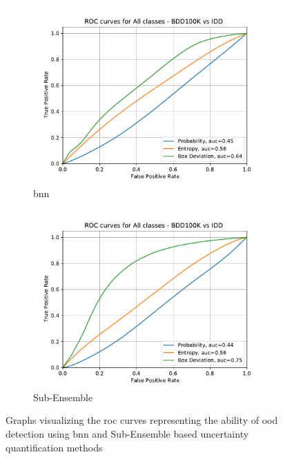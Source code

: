     \begin{figure}[ht]
    	\centering
    	\begin{subfigure}[t]{0.495\textwidth}
    		\centering
    		\includegraphics[width=\textwidth]{images/ROC/all classes_ROC_bdd_vs_idd_Score_using_bnn.pdf}
    		\caption{\acrshort{bnn}}
    	\end{subfigure}
    	\begin{subfigure}[t]{0.495\textwidth}
    		\centering
    		\includegraphics[width=\textwidth]{images/ROC/all classes_ROC_bdd_vs_idd_Score_using_subens.pdf}
    		\caption{Sub-Ensemble}
    	\end{subfigure}
    	\caption[ROC curves of \acrshort{ood} sample classification using uncertainty quantification methods]{Graphs visualizing the \acrshort{roc} curves representing the ability of \acrshort{ood} detection using \acrshort{bnn} and Sub-Ensemble based uncertainty quantification methods}
    	\label{uq_roc_curves}
    \end{figure}
    
